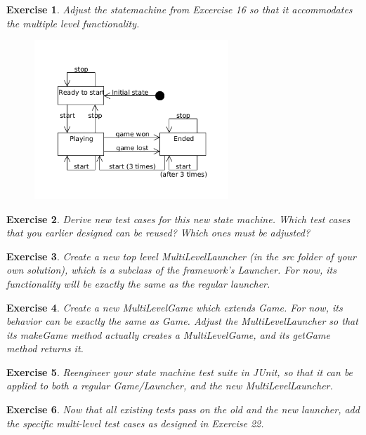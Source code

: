 \documentclass[a4paper]{article}
\newtheorem{thm}{Exercise}
\begin{document}
    \newpage
    \begin{thm}
      Adjust the statemachine from Excercise 16 so that it accommodates the multiple level functionality.
    \end{thm}
    \begin{figure}[htb]
      \includegraphics[height=6cm,keepaspectratio]{state-multi}
    \end{figure}

    \begin{thm}
      Derive new test cases for this new state machine.
      Which test cases that you earlier designed can be reused? Which ones must be adjusted?
    \end{thm}
    
    \begin{thm}
      Create a new top level MultiLevelLauncher (in the \textit{src} folder of your own solution),
      which is a subclass of the framework’s Launcher.
      For now, its functionality will be exactly the same as the regular launcher.
    \end{thm}
    
    \begin{thm}
      Create a new MultiLevelGame which extends Game.
      For now, its behavior can be exactly the same as Game.
      Adjust the MultiLevelLauncher so that its makeGame method actually creates a MultiLevelGame,
      and its getGame method returns it.
    \end{thm}
    
    \begin{thm}
      Reengineer your state machine test suite in JUnit, so that it can be applied to both a regular Game/Launcher, and the new MultiLevelLauncher.
    \end{thm}
    
    \begin{thm}
      Now that all existing tests pass on the old and the new launcher, add the specific multi-level test cases as designed in Exercise 22.
    \end{thm}
    
\end{document}
